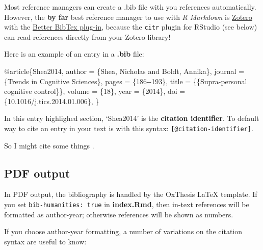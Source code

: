 \documentclass[a4paper, nobind]{templates/ociamthesis}
\newenvironment{Shaded}{\begin{snugshade}}{\end{snugshade}}
\newcommand{\DataTypeTok}[1]{\textcolor[rgb]{0.13,0.29,0.53}{#1}}
\newcommand{\NormalTok}[1]{#1}
\newcommand{\OtherTok}[1]{\textcolor[rgb]{0.56,0.35,0.01}{#1}}
\newcommand{\VariableTok}[1]{\textcolor[rgb]{0.00,0.00,0.00}{#1}}
\renewenvironment{Shaded}
{
  \vspace{10pt}%
  \begin{snugshade}%
}{%
  \end{snugshade}%
  \vspace{8pt}%
}
\begin{document}
Most reference managers can create a .bib file with you references automatically.
However, the \textbf{by far} best reference manager to use with \emph{R Markdown} is \href{https://www.zotero.org}{Zotero} with the \href{https://retorque.re/zotero-better-bibtex/}{Better BibTex plug-in}, because the \texttt{citr} plugin for RStudio (see below) can read references directly from your Zotero library!

Here is an example of an entry in a \textbf{.bib} file:

\begin{Shaded}
\begin{Highlighting}[]
\VariableTok{@article}\NormalTok{\{}\OtherTok{Shea2014}\NormalTok{,}
  \DataTypeTok{author}\NormalTok{ =        \{Shea, Nicholas and Boldt, Annika\},}
  \DataTypeTok{journal}\NormalTok{ =       \{Trends in Cognitive Sciences\},}
  \DataTypeTok{pages}\NormalTok{ =         \{186{-}{-}193\},}
  \DataTypeTok{title}\NormalTok{ =         \{\{Supra{-}personal cognitive control\}\},}
  \DataTypeTok{volume}\NormalTok{ =        \{18\},}
  \DataTypeTok{year}\NormalTok{ =          \{2014\},}
  \DataTypeTok{doi}\NormalTok{ =           \{10.1016/j.tics.2014.01.006\},}
\NormalTok{\}}
\end{Highlighting}
\end{Shaded}

In this entry highlighed section, `Shea2014' is the \textbf{citation identifier}.
To default way to cite an entry in your text is with this syntax: \texttt{{[}@citation-identifier{]}}.

So I might cite some things \autocite{Shea2014,Lottridge2012}.

\hypertarget{pdf-output}{%
\subsection{PDF output}\label{pdf-output}}

In PDF output, the bibliography is handled by the OxThesis LaTeX template.
If you set \texttt{bib-humanities:\ true} in \textbf{index.Rmd}, then in-text references will be formatted as author-year; otherwise references will be shown as numbers.

If you choose author-year formatting, a number of variations on the citation syntax are useful to know:
\end{document}
